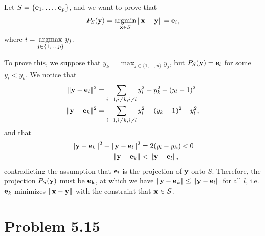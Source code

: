 \documentclass{scrartcl}
\begin{document}
Let $S = \{\mathbf{e}_1, \dotsc, \mathbf{e}_p\}$, and we want to prove that
\begin{equation}
P_S(\mb{y}) = \argmin_{\mb{x} \in S} \|\mb{x}-\mb{y}\| = \mb{e}_i ,
\end{equation}
where $i = \argmax_{j \in \{1,\dotsc,p\}} y_j$.

To prove this, we suppose that $y_k = \max_{j \in \{1,\dotsc,p\}} y_j$, but $P_S(\mathbf{y}) = \mathbf{e}_l$
for some $y_l < y_k$. We notice that
\begin{equation}
    \begin{split}
    \|\mathbf{y} - \mathbf{e}_l\|^2 & = \sum_{i=1, i\neq k, i\neq l} y_i^2 + y_k^2 + (y_l-1)^2 \\
    \|\mathbf{y} - \mathbf{e}_k\|^2 & = \sum_{i=1, i\neq k, i\neq l} y_i^2 + (y_k-1)^2 + y_l^2 ,
    \end{split}
\end{equation}
and that
\begin{equation}
\begin{split}
\|\mathbf{y} - \mathbf{e}_k\|^2 - \|\mathbf{y} - \mathbf{e}_l\|^2 & = 2(y_l-y_k) < 0 \\
\|\mathbf{y} - \mathbf{e}_k\| & < \|\mathbf{y} - \mathbf{e}_l\|,
\end{split}
\end{equation}
contradicting the assumption that $\mathbf{e}_l$ is the projection of $\mathbf{y}$ onto $S$.
Therefore, the projection $P_S(\mathbf{y})$ must be $\mathbf{e_k}$, at which we have
$\|\mathbf{y} - \mathbf{e}_k\| \le \|\mathbf{y} - \mathbf{e}_l\|$ for all $l$, i.e. $\mathbf{e}_k$
minimizes $\|\mathbf{x}-\mathbf{y}\|$ with the constraint that $\mathbf{x} \in S$.


\section*{Problem 5.15}
\end{document}
